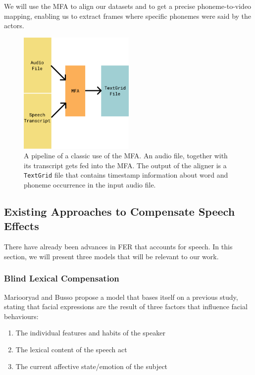 We will use the MFA to align our datasets and to get a precise phoneme-to-video mapping, enabling us to extract frames where specific phonemes were said by the actors.

\begin{figure}
    \centering
    \includegraphics[width=0.5\textwidth]{res/mfa.pdf}
    \caption{A pipeline of a classic use of the MFA. An audio file, together with its transcript gets fed into the MFA. The output of the aligner is a \texttt{TextGrid} file that contains timestamp information about word and phoneme occurrence in the input audio file.}
    \label{fig:mfa}
\end{figure}
\subsection{Existing Approaches to Compensate Speech Effects}
\label{sec:existing}
There have already been advances in FER that accounts for speech. In this section, we will present three models that will be relevant to our work.

\subsubsection{Blind Lexical Compensation}
Mariooryad and Busso \cite{mariooryad2015facial} propose a model that bases itself on a previous study, stating that facial expressions are the result of three factors that influence facial behaviours:

\begin{enumerate}
    \item The individual features and habits of the speaker
    \item The lexical content of the speech act
    \item The current affective state/emotion of the subject
\end{enumerate}

